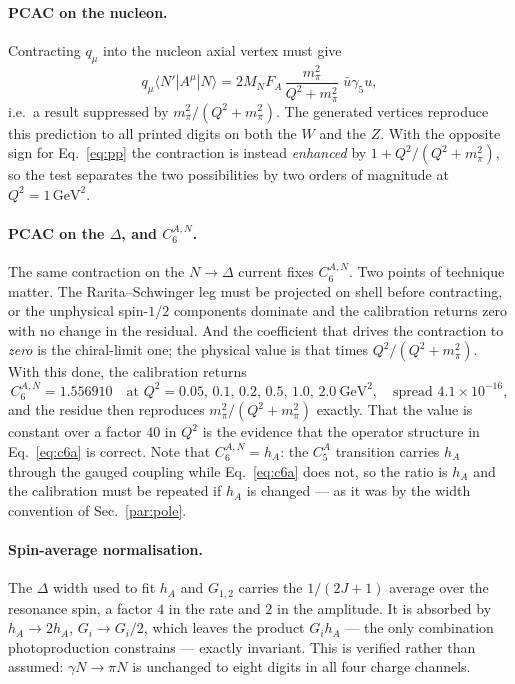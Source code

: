 \documentclass[11pt,a4paper]{article}
\begin{document}
\paragraph{PCAC on the nucleon.}
Contracting $q_\mu$ into the nucleon axial vertex must give
\begin{equation}
  q_\mu \langle N'|A^\mu|N\rangle
  = 2 M_N F_A\,\frac{m_\pi^2}{Q^2+m_\pi^2}\;\bar u \gamma_5 u ,
\end{equation}
i.e.\ a result suppressed by $m_\pi^2/(Q^2+m_\pi^2)$. The generated vertices
reproduce this prediction to all printed digits on both the $W$ and the $Z$.
With the opposite sign for Eq.~\eqref{eq:pp} the contraction is instead
\emph{enhanced} by $1 + Q^2/(Q^2+m_\pi^2)$, so the test separates the two
possibilities by two orders of magnitude at $Q^2 = 1\,\mathrm{GeV}^2$.

\paragraph{PCAC on the $\Delta$, and $C_6^{A,N}$.}
The same contraction on the $N\to\Delta$ current fixes $C_6^{A,N}$. Two points
of technique matter. The Rarita--Schwinger leg must be projected on shell before
contracting, or the unphysical spin-$1/2$ components dominate and the
calibration returns zero with no change in the residual. And the coefficient
that drives the contraction to \emph{zero} is the chiral-limit one; the physical
value is that times $Q^2/(Q^2+m_\pi^2)$. With this done, the calibration returns
\begin{equation}
  C_6^{A,N} = 1.556910
  \quad\text{at }Q^2 = 0.05,\,0.1,\,0.2,\,0.5,\,1.0,\,2.0\ \mathrm{GeV}^2,
  \quad\text{spread } 4.1\times10^{-16},
\end{equation}
and the residue then reproduces $m_\pi^2/(Q^2+m_\pi^2)$ exactly. That the value
is constant over a factor $40$ in $Q^2$ is the evidence that the operator
structure in Eq.~\eqref{eq:c6a} is correct. Note that
$C_6^{A,N} = h_A$: the $C_5^A$ transition carries $h_A$ through the gauged
coupling while Eq.~\eqref{eq:c6a} does not, so the ratio is $h_A$ and the
calibration must be repeated if $h_A$ is changed --- as it was by the width
convention of Sec.~\ref{par:pole}.

\paragraph{Spin-average normalisation.}
The $\Delta$ width used to fit $h_A$ and $G_{1,2}$ carries the $1/(2J+1)$
average over the resonance spin, a factor $4$ in the rate and $2$ in the
amplitude. It is absorbed by $h_A \to 2h_A$, $G_i \to G_i/2$, which leaves the
product $G_i h_A$ — the only combination photoproduction constrains — exactly
invariant. This is verified rather than assumed: $\gamma N\to\pi N$ is unchanged
to eight digits in all four charge channels.
\end{document}
